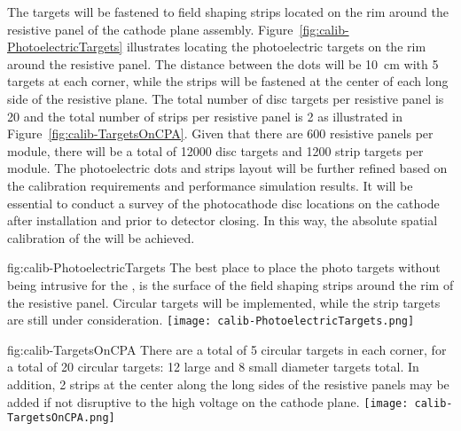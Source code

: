 The targets will be fastened to field shaping strips located on the rim around the resistive panel of the cathode plane assembly. Figure~\ref{fig:calib-PhotoelectricTargets} illustrates locating the photoelectric targets on the rim around the resistive panel. The distance between the dots will be \SI{10}{\cm} with \num{5} targets at each corner, while the strips will be fastened at the center of each long side of the resistive plane. The total number of disc targets per resistive panel is \num{20} and the total number of strips per resistive panel is \num{2} as illustrated in Figure~\ref{fig:calib-TargetsOnCPA}.  Given that there are \num{600} resistive panels per \single module, there will be a total of \num{12000} disc targets and \num{1200} strip targets per module. %
The photoelectric dots and strips layout will be further refined based on the calibration requirements and performance simulation results. It will be essential to conduct a survey of the photocathode disc locations on the cathode after installation and prior to detector closing. In this way, the absolute spatial calibration of the \efield will be achieved. 

\begin{dunefigure}{fig:calib-PhotoelectricTargets}
{The best place to place the photo targets without being intrusive for the \efield, is the surface of the field shaping strips around the rim of the resistive panel. Circular targets will be implemented, while the strip targets are still under consideration.}
\texttt{[image: calib-PhotoelectricTargets.png]} 
\end{dunefigure}

\begin{dunefigure}{fig:calib-TargetsOnCPA}
{There are a total of 5 circular targets in each corner, for a total of 20 circular targets: 12 large and 8 small diameter targets total. In addition, 2 strips at the center along the long sides of the resistive panels may be added if not disruptive to the high voltage on the cathode plane.} 
\texttt{[image: calib-TargetsOnCPA.png]} 
\end{dunefigure}

